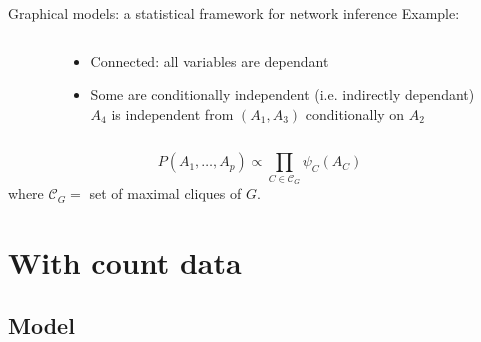 \documentclass[11pt]{beamer}
\newcommand{\Ccal}{\mathcal{C}}
\newcommand{\edgeunit}{1.5}
\newcommand{\emphase}[1]{\textcolor{Complement}{#1}}
\newcommand{\bleu}[1]{\textcolor{Framableulight}{#1}}
\begin{document}
\begin{frame}{Graphical models: a statistical framework for network inference}
\bleu{Example}:\bigskip
\begin{columns}
\begin{column}{0.3\linewidth}\hspace{0.5cm}
\\
\end{column}
\begin{column}{0.5\linewidth}
	\begin{itemize}
	\item Connected: all variables are dependant \bigskip
	\item Some are \emphase{conditionally independent} (i.e. indirectly dependant)\\\bigskip
	 $A_4$ is independent from $(A_1, A_3)$ conditionally on $A_2$ \vspace{0.2cm}
\end{itemize}
\end{column}
\end{columns}
\begin{center}
    \[ P(A_1, \dots, A_p) \propto \prod_{C \in \Ccal_G} \psi_C(A_C) \]
  where $\Ccal_G =$ set of maximal cliques of $G$.
\end{center}

\end{frame}

\section{With count data}
\subsection{Model}
\end{document}
